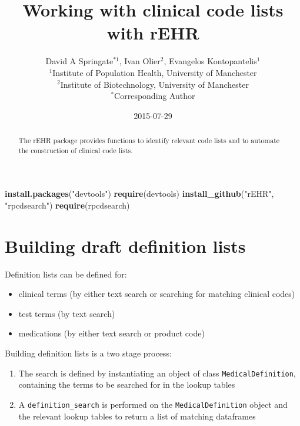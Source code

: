 \documentclass[]{article}
\title{Working with clinical code lists with rEHR}
\author{David A Springate\(^{*1}\), Ivan Olier\(^{2}\), Evangelos
Kontopantelis\(^{1}\) \\ \(^{1}\)Institute of Population Health, University of Manchester \\ \(^{2}\)Institute of Biotechnology, University of Manchester \\ \(^{*}\)Corresponding Author}
\date{2015-07-29}
\newenvironment{Shaded}{\begin{snugshade}}{\end{snugshade}}
\newcommand{\KeywordTok}[1]{\textcolor[rgb]{0.13,0.29,0.53}{\textbf{{#1}}}}
\newcommand{\StringTok}[1]{\textcolor[rgb]{0.31,0.60,0.02}{{#1}}}
\newcommand{\NormalTok}[1]{{#1}}
\begin{document}
\maketitle

\begin{abstract}
The rEHR package provides functions to identify relevant code lists and
to automate the construction of clinical code lists.
\end{abstract}

\begin{Shaded}
\begin{Highlighting}[]
\KeywordTok{install.packages}\NormalTok{(}\StringTok{"devtools"}\NormalTok{)}
\KeywordTok{require}\NormalTok{(devtools)}
\KeywordTok{install_github}\NormalTok{(}\StringTok{"rEHR"}\NormalTok{, }\StringTok{"rpcdsearch"}\NormalTok{)}
\KeywordTok{require}\NormalTok{(rpcdsearch)}
\end{Highlighting}
\end{Shaded}

\section{Building draft definition
lists}\label{building-draft-definition-lists}

Definition lists can be defined for:

\begin{itemize}
\itemsep1pt\parskip0pt
\item
  clinical terms (by either text search or searching for matching
  clinical codes)
\item
  test terms (by text search)
\item
  medications (by either text search or product code)
\end{itemize}

Building definition lists is a two stage process:

\begin{enumerate}
\def\labelenumi{\arabic{enumi}.}
\itemsep1pt\parskip0pt
\item
  The search is defined by instantiating an object of class
  \texttt{MedicalDefinition}, containing the terms to be searched for in
  the lookup tables
\item
  A \texttt{definition\_search} is performed on the
  \texttt{MedicalDefinition} object and the relevant lookup tables to
  return a list of matching dataframes
\end{enumerate}
\end{document}
